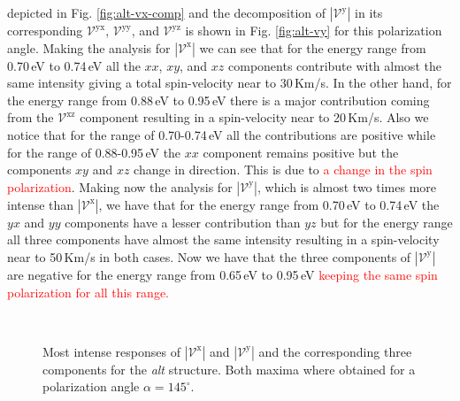 \documentclass[prb,11pt,tightenlines,twocolumn,aps]{revtex4-1}
\begin{document}
depicted in Fig. \ref{fig:alt-vx-comp} and the decomposition of
$|\mathcal{V}^{\mathrm{y}}|$ in its corresponding $\mathcal{V}^{\mathrm{yx}}$,
$\mathcal{V}^{\mathrm{yy}}$, and $\mathcal{V}^{\mathrm{yz}}$ is shown in Fig.
\ref{fig:alt-vy} for this polarization angle.
%
Making the analysis for $|\mathcal{V}^{\mathrm{x}}|$ we can see that for the
energy range from 0.70\,eV to 0.74\,eV all the $xx$, $xy$, and $xz$ components
contribute with almost the same intensity giving a total spin-velocity near to
30\,Km/s. In the other hand, for the energy range from 0.88\,eV to 0.95\,eV
there is a major contribution coming from the $\mathcal{V}^{\mathrm{xz}}$
component resulting in a spin-velocity near to 20\,Km/s.
%
Also we notice that for the range of 0.70-0.74\,eV all the contributions are
positive while for the range of 0.88-0.95\,eV the $xx$ component remains
positive but the components $xy$ and $xz$ change in direction. This is due to
\textcolor{red}{\large a change in the spin polarization}.
%
Making now the analysis for $|\mathcal{V}^{\mathrm{y}}|$, which is almost two
times more intense than $|\mathcal{V}^{\mathrm{x}}|$, we have that for the
energy range from 0.70\,eV to 0.74\,eV the $yx$ and $yy$ components have a
lesser contribution than $yz$ but for the energy range all three components
have almost the same intensity resulting in a spin-velocity near to 50\,Km/s in
both cases.
%
Now we have that the three components of $|\mathcal{V}^{\mathrm{y}}|$ are
negative for the energy range from 0.65\,eV to 0.95\,eV \textcolor{red}{keeping
the same spin polarization for all this range.}

\begin{figure}[tb]
    \centering
    \label{fig:alt-vx-comp}
    \\
    \label{fig:alt-vy-comp}
    \caption{Most intense responses of $|\mathcal{V}^{\mathrm{x}}|$ and
    $|\mathcal{V}^{\mathrm{y}}|$ and the corresponding three components for the
    \emph{alt} structure. Both maxima where obtained for a polarization
    angle $\alpha=145^{\circ}$. }
    \label{fig:alt-vab-xy-comp}
\end{figure}
\end{document}

